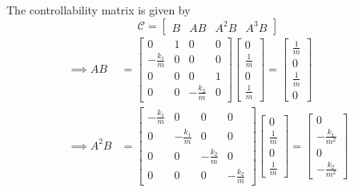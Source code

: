 The controllability matrix is given by
\begin{equation*}
    \mathcal{C}
    =
    \begin{bmatrix}
        B & AB & A^{2}B & A^{3}B
    \end{bmatrix}
\end{equation*}
\begin{align*}
    \implies
    AB
     & =
    \begin{bmatrix}
        0                & 1 & 0                & 0 \\
        -\frac{k_{1}}{m} & 0 & 0                & 0 \\
        0                & 0 & 0                & 1 \\
        0                & 0 & -\frac{k_{2}}{m} & 0
    \end{bmatrix}
    \begin{bmatrix}
        0           \\
        \frac{1}{m} \\
        0           \\
        \frac{1}{m}
    \end{bmatrix}
    =
    \begin{bmatrix}
        \frac{1}{m} \\
        0           \\
        \frac{1}{m} \\
        0
    \end{bmatrix}
    \\
    \implies
    A^{2}B
     & =
    \begin{bmatrix}
        -\frac{k_{1}}{m} & 0 & 0 & 0 \\ 0 & -\frac{k_{1}}{m} & 0 & 0\\ 0 & 0 & -\frac{k_{2}}{m} & 0\\ 0 & 0 & 0 & -\frac{k_{2}}{m}
    \end{bmatrix}
    \begin{bmatrix}
        0           \\
        \frac{1}{m} \\
        0           \\
        \frac{1}{m}
    \end{bmatrix}
    =
    \begin{bmatrix}
        0                  \\
        -\frac{k_{1}}{m^2} \\
        0                  \\
        -\frac{k_{2}}{m^2}
    \end{bmatrix}

\end{align*}
